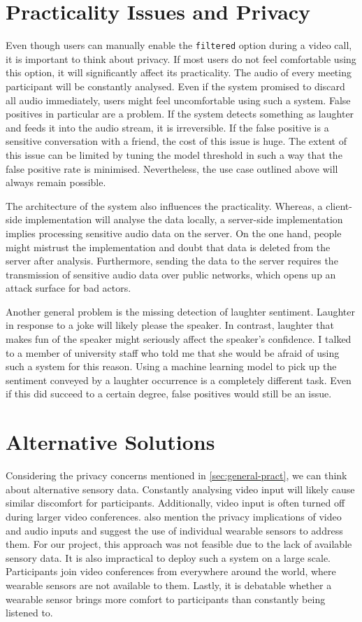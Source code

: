 \documentclass[bsc,frontabs,parskip,deptreport]{infthesis}
\begin{document}
\section{Practicality Issues and Privacy} \label{sec:general-pract}
Even though users can manually enable the \texttt{filtered} option during a video call, it is important to think about privacy. If most users do not feel comfortable using this option, it will significantly affect its practicality.  
The audio of every meeting participant will be constantly analysed. Even if the system promised to discard all audio immediately, users might feel uncomfortable using such a system. False positives in particular are a problem. If the system detects something as laughter and feeds it into the audio stream, it is irreversible. If the false positive is a sensitive conversation with a friend, the cost of this issue is huge. 
The extent of this issue can be limited by tuning the model threshold in such a way that the false positive rate is minimised. Nevertheless, the use case outlined above will always remain possible. 

The architecture of the system also influences the practicality. Whereas, a client-side implementation will analyse the data locally, a server-side implementation implies processing sensitive audio data on the server. On the one hand, people might mistrust the implementation and doubt that data is deleted from the server after analysis. Furthermore, sending the data to the server requires the transmission of sensitive audio data over public networks, which opens up an attack surface for bad actors. 

Another general problem is the missing detection of laughter sentiment. Laughter in response to a joke will likely please the speaker. In contrast, laughter that makes fun of the speaker might seriously affect the speaker's confidence. I talked to a member of university staff who told me that she would be afraid of using such a system for this reason. 
Using a machine learning model to pick up the sentiment conveyed by a laughter occurrence is a completely different task. Even if this did succeed to a certain degree, false positives would still be an issue.


\section{Alternative Solutions}
Considering the privacy concerns mentioned in \autoref{sec:general-pract}, we can think about alternative sensory data. 
Constantly analysing video input will likely cause similar discomfort for participants. Additionally, video input is often turned off during larger video conferences.
\citet{cosentino2016quantitative} also mention the privacy implications of video and audio inputs and suggest the use of individual wearable sensors to address them. For our project, this approach was not feasible due to the lack of available sensory data.
It is also impractical to deploy such a system on a large scale. Participants join video conferences from everywhere around the world, where wearable sensors are not available to them. Lastly, it is debatable whether a wearable sensor brings more comfort to participants than constantly being listened to. 
\end{document}
